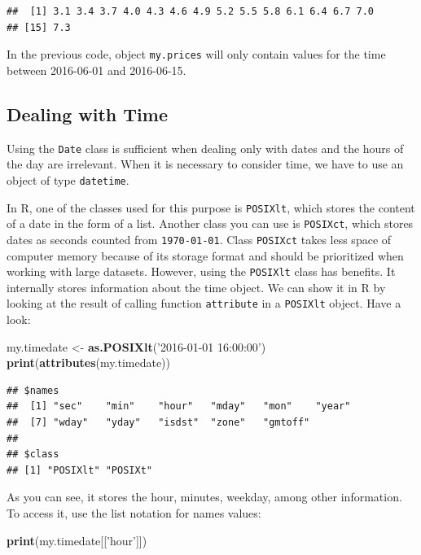 \documentclass[11pt,]{book}
\newenvironment{Shaded}{\begin{snugshade}}{\end{snugshade}}
\newcommand{\KeywordTok}[1]{\textcolor[rgb]{0.27,0.27,0.27}{\textbf{#1}}}
\newcommand{\StringTok}[1]{\textcolor[rgb]{0.5,0.5,0.5}{#1}}
\newcommand{\NormalTok}[1]{#1}
\begin{document}
\begin{verbatim}
##  [1] 3.1 3.4 3.7 4.0 4.3 4.6 4.9 5.2 5.5 5.8 6.1 6.4 6.7 7.0
## [15] 7.3
\end{verbatim}

In the previous code, object \texttt{my.prices} will only contain values
for the time between 2016-06-01 and 2016-06-15.

\subsection{Dealing with Time}\label{dealing-with-time}

Using the \texttt{Date} class is sufficient when dealing only with dates
and the hours of the day are irrelevant. When it is necessary to
consider time, we have to use an object of type \texttt{datetime}.

In R, one of the classes used for this purpose is \texttt{POSIXlt},
which stores the content of a date in the form of a list. Another class
you can use is \texttt{POSIXct}, which stores dates as seconds counted
from \texttt{1970-01-01}. Class \texttt{POSIXct} takes less space of
computer memory because of its storage format and should be prioritized
when working with large datasets. However, using the \texttt{POSIXlt}
class has benefits. It internally stores information about the time
object. We can show it in R by looking at the result of calling function
\texttt{attribute} in a \texttt{POSIXlt} object. Have a look:
  

\begin{Shaded}
\begin{Highlighting}[]
\NormalTok{my.timedate <-}\StringTok{ }\KeywordTok{as.POSIXlt}\NormalTok{(}\StringTok{'2016-01-01 16:00:00'}\NormalTok{)}
\KeywordTok{print}\NormalTok{(}\KeywordTok{attributes}\NormalTok{(my.timedate))}
\end{Highlighting}
\end{Shaded}

\begin{verbatim}
## $names
##  [1] "sec"    "min"    "hour"   "mday"   "mon"    "year"  
##  [7] "wday"   "yday"   "isdst"  "zone"   "gmtoff"
## 
## $class
## [1] "POSIXlt" "POSIXt"
\end{verbatim}

As you can see, it stores the hour, minutes, weekday, among other
information. To access it, use the list notation for names values:

\begin{Shaded}
\begin{Highlighting}[]
\KeywordTok{print}\NormalTok{(my.timedate[[}\StringTok{'hour'}\NormalTok{]])}
\end{Highlighting}
\end{Shaded}
\end{document}
